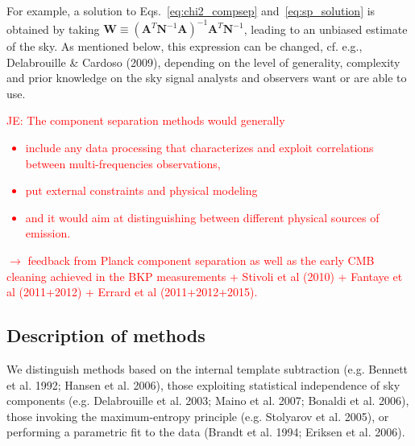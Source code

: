 For example, a solution to Eqs.~\ref{eq:chi2_compsep} and~\ref{eq:sp_solution} is obtained by taking $\mathbf{W} \equiv \left( \mathbf{A}^T\mathbf{N}^{-1}\mathbf{A} \right)^{-1}\mathbf{A}^T\mathbf{N}^{-1}$, leading to an unbiased estimate of the sky. As mentioned below, this expression can be changed, cf. e.g., Delabrouille \& Cardoso (2009), depending on the level of generality, complexity and prior knowledge on the sky signal analysts and observers want or are able to use. 


\textcolor{red}{JE: The component separation methods would generally
\begin{itemize}
	\item include any data processing that characterizes and exploit correlations between multi-frequencies observations,
	\item put external constraints and physical modeling
	\item and it would aim at distinguishing between different physical sources of emission.
\end{itemize}
$\rightarrow$ feedback from Planck component separation as well as the early CMB cleaning achieved in the BKP measurements + Stivoli et al (2010) + Fantaye et al (2011+2012) + Errard et al (2011+2012+2015).}

\subsection{Description of methods}

We distinguish methods based on the internal template subtraction (e.g. Bennett et al. 1992; Hansen et al. 2006), those exploiting statistical independence of sky components (e.g. Delabrouille et al. 2003; Maino et al. 2007; Bonaldi et al. 2006), those invoking the maximum-entropy principle (e.g. Stolyarov et al. 2005), or performing a parametric fit to the data (Brandt et al. 1994; Eriksen et al. 2006).

